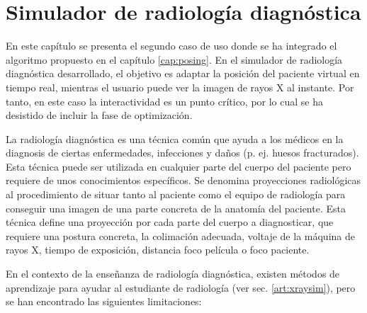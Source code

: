 \chapter{Simulador de radiología diagnóstica} 
\label{cap:xray}

En este capítulo se presenta el segundo caso de uso donde se ha integrado el algoritmo propuesto en el capítulo \ref{cap:posing}. En el simulador de radiología diagnóstica desarrollado, el objetivo es adaptar la posición del paciente virtual en tiempo real, mientras el usuario puede ver la imagen de rayos X al instante. Por tanto, en este caso la interactividad es un punto crítico, por lo cual se ha desistido de incluir la fase de optimización.


La radiología diagnóstica es una técnica común que ayuda a los médicos en la diagnosis de ciertas enfermedades, infecciones y daños (p. ej. huesos fracturados). Esta técnica puede ser utilizada en cualquier parte del cuerpo del paciente pero requiere de unos conocimientos específicos. Se denomina proyecciones radiológicas al procedimiento de situar tanto al paciente como el equipo de radiología para conseguir una imagen de una parte concreta de la anatomía del paciente. Esta técnica define una proyección por cada parte del cuerpo a diagnosticar, que requiere una postura concreta, la colimación adecuada, voltaje de la máquina de rayos X, tiempo de exposición, distancia foco película o foco paciente. 


En el contexto de la enseñanza de radiología diagnóstica, existen métodos de aprendizaje para ayudar al estudiante de radiología (ver sec. \ref{art:xraysim}), pero se han encontrado las siguientes limitaciones:


